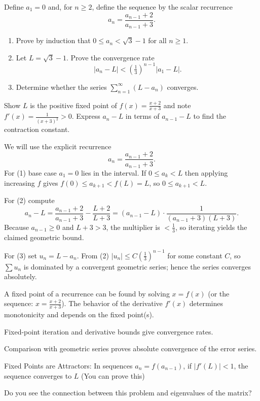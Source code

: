 \begin{problem}
Define $a_1=0$ and, for $n\ge 2$, define the sequence by the scalar recurrence
\[
a_n=\frac{a_{n-1}+2}{a_{n-1}+3}.
\]


\begin{enumerate}
    \item Prove by induction that $0\le a_n<\sqrt{3}-1$ for all $n\ge1$.
    \item Let $L=\sqrt{3}-1$. Prove the convergence rate
    \[ |a_n-L|<\left(\tfrac{1}{3}\right)^{n-1}|a_1-L|. \]
    \item Determine whether the series $\sum_{n=1}^\infty (L-a_n)$ converges.
\end{enumerate}
\end{problem}

\begin{hint}
Show $L$ is the positive fixed point of $f(x)=\tfrac{x+2}{x+3}$ and note $f'(x)=\tfrac{1}{(x+3)^2}>0$. 
Express $a_n-L$ in terms of $a_{n-1}-L$ to find the contraction constant.
\end{hint}

\begin{solution}
We will use the explicit recurrence
\[
a_n=\frac{a_{n-1}+2}{a_{n-1}+3}.
\]
For (1) base case $a_1=0$ lies in the interval. If $0\le a_k< L$ then applying increasing $f$ gives $f(0)\le a_{k+1}<f(L)=L$, so $0\le a_{k+1}<L$. 

For (2) compute
\[
a_n-L=\frac{a_{n-1}+2}{a_{n-1}+3}-\frac{L+2}{L+3}=(a_{n-1}-L)\cdot\frac{1}{(a_{n-1}+3)(L+3)}.
\]
Because $a_{n-1}\ge0$ and $L+3>3$, the multiplier is $<\tfrac{1}{3}$, so iterating yields the claimed geometric bound.

For (3) set $u_n=L-a_n$. From (2) $|u_n|\le C(\tfrac{1}{3})^{n-1}$ for some constant $C$, so $\sum u_n$ is dominated by a convergent geometric series; hence the series converges absolutely.
\end{solution}

\begin{takeaways}
    \item A fixed point of a recurrence can be found by solving $x=f(x)$ (or the sequence: $x=\frac{x+2}{x+3}$). The behavior of the derivative $f'(x)$ determines monotonicity and depends on the fixed point(s).
\item Fixed-point iteration and derivative bounds give convergence rates.
\item Comparison with geometric series proves absolute convergence of the error series.
\item Fixed Points are Attractors: In sequences $a_n = f(a_{n-1})$, if $|f'(L)| < 1$, the sequence converges to $L$ (You can prove this)
\item Do you see the connection between this problem and eigenvalues of the matrix? 
\end{takeaways}
